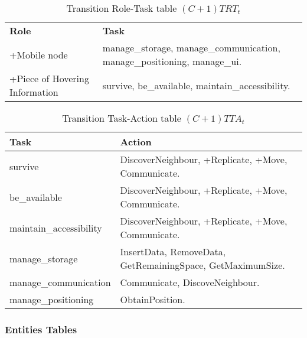 \begin{table}[H]
	\centering
	\begin{tabular}{|p{4cm}|p{8cm}|}
			\hline
			\textbf{Role} & \textbf{Task} \\
			+Mobile node & manage\_storage, manage\_communication,
			manage\_positioning, manage\_ui.  \\
			\hline
			+Piece of Hovering Information & survive, be\_available, maintain\_accessibility. \\
			\hline
		\end{tabular}
	\caption{Transition Role-Task table $(C+1)TRT_t$}
	\label{tab:cp1trtt}
\end{table}

\begin{table}[H]
	\centering
	\begin{tabular}{|p{4cm}|p{8cm}|}
			\hline
			\textbf{Task} & \textbf{Action} \\
			\hline
			survive & DiscoverNeighbour, +Replicate, +Move, Communicate.
			\\
			\hline
			be\_available & DiscoverNeighbour, +Replicate, +Move,
			Communicate. \\
			\hline
			maintain\_accessibility & DiscoverNeighbour,
			+Replicate, +Move, Communicate. \\
			\hline
			manage\_storage & InsertData, RemoveData, GetRemainingSpace,
			GetMaximumSize. \\
			\hline
			manage\_communication & Communicate, DiscoveNeighbour. \\
			\hline
			manage\_positioning & ObtainPosition. \\
			\hline
		\end{tabular}
	\caption{Transition Task-Action table $(C+1)TTA_t$}
	\label{tab:cp1ttat}
\end{table}

\subsubsection{Entities Tables}

